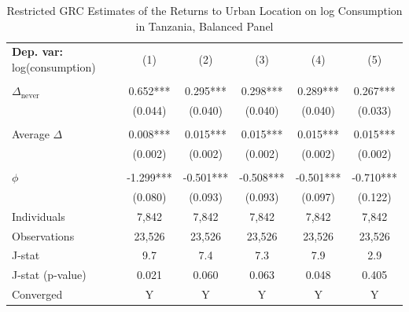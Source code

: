 \begin{table}[htbp] \centering \begin{threeparttable}
 \caption{Restricted GRC Estimates of the Returns to Urban Location on log Consumption in Tanzania, Balanced Panel} 
 \label{tab:GRC_TZA_consumption_urban_bal} 
\begin{tabular}{l ccccc} \toprule  \textbf{Dep. var:}  log(consumption) 
                    &\multicolumn{1}{c}{(1)}   &\multicolumn{1}{c}{(2)}   &\multicolumn{1}{c}{(3)}   &\multicolumn{1}{c}{(4)}   &\multicolumn{1}{c}{(5)}   \\
                    &               &               &               &               &               \\
\addlinespace
$\Delta_{\text{never}}$&       0.652***&       0.295***&       0.298***&       0.289***&       0.267***\\
                    &     (0.044)   &     (0.040)   &     (0.040)   &     (0.040)   &     (0.033)   \\
                    &               &               &               &               &               \\
\addlinespace
Average $\Delta$    &       0.008***&       0.015***&       0.015***&       0.015***&       0.015***\\
                    &     (0.002)   &     (0.002)   &     (0.002)   &     (0.002)   &     (0.002)   \\
                    &               &               &               &               &               \\
\addlinespace
$\phi$              &      -1.299***&      -0.501***&      -0.508***&      -0.501***&      -0.710***\\
                    &     (0.080)   &     (0.093)   &     (0.093)   &     (0.097)   &     (0.122)   \\
\addlinespace
Individuals         &       7,842   &       7,842   &       7,842   &       7,842   &       7,842   \\
Observations        &      23,526   &      23,526   &      23,526   &      23,526   &      23,526   \\
J-stat              &         9.7   &         7.4   &         7.3   &         7.9   &         2.9   \\
J-stat (p-value)    &       0.021   &       0.060   &       0.063   &       0.048   &       0.405   \\
Converged           &           Y   &           Y   &           Y   &           Y   &           Y   \\

\end{tabular}
\end{threeparttable}
\end{table}
